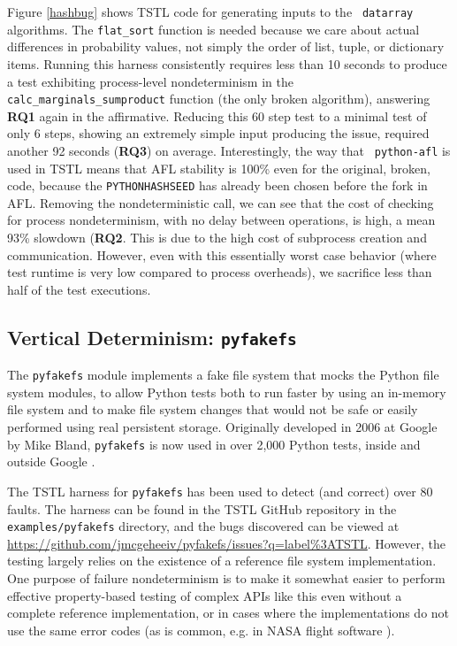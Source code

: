 Figure \ref{hashbug} shows TSTL code for generating inputs to the {\tt
  datarray} algorithms.  The {\tt flat\_sort} function is
needed because we care about actual differences in probability values,
not simply the order of list, tuple, or dictionary items.  Running
this harness consistently requires less than 10 seconds to produce a test exhibiting process-level nondeterminism in
the {\tt calc\_marginals\_sumproduct} function (the only broken
algorithm), answering {\bf RQ1} again in the affirmative.  Reducing this 60 step test to a minimal test of only 6 steps,
showing an extremely simple input producing the issue, 
required another 92 seconds ({\bf RQ3}) on average.  Interestingly, the way that {\tt
  python-afl} is used in TSTL means that AFL stability is 100\% even
for the original, broken, code,
because the {\tt PYTHONHASHSEED} has already been chosen before the
fork in AFL.  Removing the nondeterministic call, we can see that the cost of
checking for process nondeterminism, with no delay between operations,
is high, a mean 93\% slowdown ({\bf RQ2}.  This is due to the high cost of subprocess
creation and communication. However, even with this essentially worst
case behavior (where test runtime is very low compared to process overheads),
we sacrifice less than half of the test executions.

\subsection {Vertical Determinism: {\tt pyfakefs}}

The {\tt pyfakefs} \cite{pyfakefs} module implements a fake file
system that mocks the Python file system modules, to allow Python
tests both to run faster by using an in-memory file system and to make
file system changes that would not be safe or easily performed using
real persistent storage.  Originally developed in 2006 at Google by
Mike Bland, {\tt pyfakefs} is now used in over 2,000 Python tests,
inside and outside Google \cite{pyfakefs}.

The TSTL harness for {\tt pyfakefs} has been used to detect (and
correct) over 80 faults.  The harness can be found in the TSTL GitHub repository
in the {\tt examples/pyfakefs} directory, and the bugs discovered can
be viewed at \url{https://github.com/jmcgeheeiv/pyfakefs/issues?q=label%3ATSTL}.  However, the testing largely relies on
the existence of a reference file system implementation.  One purpose
of failure nondeterminism is to make it somewhat easier to perform effective
property-based testing of
complex APIs like this even without a complete reference implementation, or in cases
where the implementations do not use the same error
codes (as is common, e.g. in NASA flight software
\cite{ICSEDiff,CFV08}).

